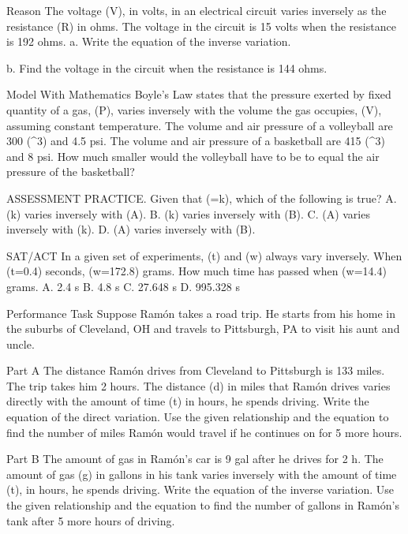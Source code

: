 \documentclass{article}
\newenvironment{practice}[2]{}{}        %
\newcommand{\answer}[1]{}               %
\newcommand{\placeholder}[2]{}          %
\begin{document}
\begin{practice}{22}{3}
Reason The voltage (V), in volts, in an electrical circuit varies inversely as the resistance (R) in ohms. The voltage in the circuit is 15 volts when the resistance is 192 ohms.
a. Write the equation of the inverse variation.
\answer{(V=\frac{2880}{R})}
b. Find the voltage in the circuit when the resistance is 144 ohms.
\answer{When the resistance is 144 ohms, the voltage is 20 V.}
\end{practice}
\begin{practice}{23}{2}
Model With Mathematics Boyle's Law states that the pressure exerted by fixed quantity of a gas, (P), varies inversely with the volume the gas occupies, (V), assuming constant temperature.
The volume and air pressure of a volleyball are 300 (^3) and 4.5 psi. The volume and air pressure of a basketball are 415 (^3) and 8 psi. How much smaller would the volleyball have to be to equal the air pressure of the basketball?
\answer{131.25 (\text{in.}^3)}
\end{practice}
\begin{practice}{24}{2}
ASSESSMENT PRACTICE. Given that (=k), which of the following is true?
A. (k) varies inversely with (A).
B. (k) varies inversely with (B).
C. (A) varies inversely with (k).
D. (A) varies inversely with (B).
\answer{B}
\end{practice}
\begin{practice}{25}{3}
SAT/ACT In a given set of experiments, (t) and (w) always vary inversely. When (t=0.4) seconds, (w=172.8) grams. How much time has passed when (w=14.4) grams.
A. 2.4 s
B. 4.8 s
C. 27.648 s
D. 995.328 s
\answer{B}
\end{practice}
\begin{practice}{26}{3}
Performance Task Suppose Ramón takes a road trip. He starts from his home in the suburbs of Cleveland, OH and travels to Pittsburgh, PA to visit his aunt and uncle.
\placeholder{map}{Tan/green road map with white route from teal dot Cleveland at upper left to orange dot Pittsburgh at lower right. Callouts 133 mi in2 h near upper route and ? miles in5 h near lower route.}
Part A The distance Ramón drives from Cleveland to Pittsburgh is 133 miles. The trip takes him 2 hours. The distance (d) in miles that Ramón drives varies directly with the amount of time (t) in hours, he spends driving. Write the equation of the direct variation. Use the given relationship and the equation to find the number of miles Ramón would travel if he continues on for 5 more hours.
\answer{(d=66.5t); 465.5 mi}
Part B The amount of gas in Ramón's car is 9 gal after he drives for 2 h. The amount of gas (g) in gallons in his tank varies inversely with the amount of time (t), in hours, he spends driving. Write the equation of the inverse variation. Use the given relationship and the equation to find the number of gallons in Ramón's tank after 5 more hours of driving.
\answer{(g=\frac{18}{t}); (\approx2.57) gal}
\end{practice}
\end{document}
